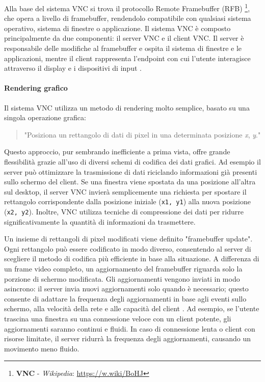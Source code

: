 \documentclass[12pt,a4paper,openright,twoside]{book}
\begin{document}
Alla base del sistema \ac{VNC} si trova il protocollo Remote Framebuffer (RFB)
\footnote{\textbf{\ac{VNC}} - \emph{Wikipedia}: \url{https://w.wiki/BoHJ}},
che opera a livello di framebuffer,
rendendolo compatibile con qualsiasi sistema operativo,
sistema di finestre o applicazione.
%
Il sistema \ac{VNC} è composto principalmente da due componenti:
il server \ac{VNC} e il client \ac{VNC}.
%
Il server è responsabile delle modifiche al framebuffer e ospita il sistema di finestre e le applicazioni,
mentre il client rappresenta l'endpoint con cui l'utente interagisce attraverso il display e i dispositivi di input \cite{richardson1998vnc}.

\paragraph{Rendering grafico}

Il sistema \ac{VNC} utilizza un metodo di rendering molto semplice, basato su una singola operazione grafica:
\begin{quote}
    "Posiziona un rettangolo di dati di pixel in una determinata posizione \emph{x}, \emph{y}."
\end{quote}
Questo approccio, pur sembrando inefficiente a prima vista, offre grande flessibilità grazie all'uso di diversi schemi di codifica dei dati grafici.
%
Ad esempio il server può ottimizzare la trasmissione di dati riciclando informazioni già presenti sullo schermo del client.
%
Se una finestra viene spostata da una posizione all'altra sul desktop,
il server \ac{VNC} invierà semplicemente una richiesta per spostare il rettangolo corrispondente dalla posizione iniziale (\texttt{x1, y1}) alla nuova posizione (\texttt{x2, y2}).
%
Inoltre, \ac{VNC} utilizza tecniche di compressione dei dati per ridurre significativamente la quantità di informazioni da trasmettere.

Un insieme di rettangoli di pixel modificati viene definito "framebuffer update".
Ogni rettangolo può essere codificato in modo diverso,
consentendo al server di scegliere il metodo di codifica più efficiente in base alla situazione.
%
A differenza di un frame video completo,
un aggiornamento del framebuffer riguarda solo la porzione di schermo modificata.
%
Gli aggiornamenti vengono inviati in modo asincrono: il server invia nuovi aggiornamenti solo quando è necessario;
questo consente di adattare la frequenza degli aggiornamenti in base agli eventi sullo schermo, alla velocità della rete e alle capacità del client \cite{richardson1998vnc}.
%
Ad esempio, se l'utente trascina una finestra su una connessione veloce con un client potente,
gli aggiornamenti saranno continui e fluidi. In caso di connessione lenta o client con risorse limitate,
il server ridurrà la frequenza degli aggiornamenti, causando un movimento meno fluido.
\end{document}
